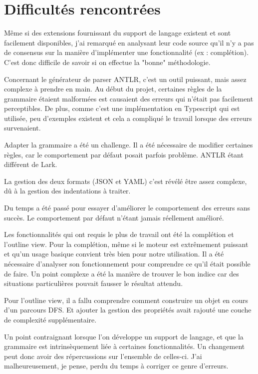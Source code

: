 \documentclass[
    iict, %
    il, %
]{heig-tb}
\begin{document}
\section{Difficultés rencontrées}

Même si des extensions fournissant du support de langage existent et sont facilement disponibles, j'ai remarqué en analysant leur code source qu'il n'y a pas de consensus sur la manière d'implémenter une fonctionnalité (ex : complétion).
C'est donc difficile de savoir si on effectue la "bonne" méthodologie.

Concernant le générateur de parser ANTLR, c'est un outil puissant, mais assez complexe à prendre en main.
Au début du projet, certaines règles de la grammaire étaient malformées est causaient des erreurs qui n'était pas facilement perceptibles.
De plus, comme c'est une implémentation en Typescript qui est utilisée, peu d'exemples existent et cela a compliqué le travail lorsque des erreurs survenaient.

Adapter la grammaire a été un challenge. Il a été nécessaire de modifier certaines règles, car le comportement par défaut posait parfois problème. ANTLR étant différent de Lark.

La gestion des deux formats (JSON et YAML) c'est révélé être assez complexe, dû à la gestion des indentations à traiter.

Du temps a été passé pour essayer d'améliorer le comportement des erreurs sans succès. Le comportement par défaut n'étant jamais réellement amélioré.

Les fonctionnalités qui ont requis le plus de travail ont été la complétion et l'outline view.
Pour la complétion, même si le moteur est extrêmement puissant et qu'un usage basique convient très bien pour notre utilisation.
Il a été nécessaire d'analyser son fonctionnement pour comprendre ce qu'il était possible de faire.
Un point complexe a été la manière de trouver le bon indice car des situations particulières pouvait fausser le résultat attendu.

Pour l'outline view, il a fallu comprendre comment construire un objet en cours d'un parcours DFS. Et ajouter la gestion des propriétés avait rajouté une couche de complexité supplémentaire.

Un point contraignant lorsque l'on développe un support de langage, et que la grammaire est intrinsèquement liée à certaines fonctionnalités.
Un changement peut donc avoir des répercussions sur l'ensemble de celles-ci.
J'ai malheureusement, je pense, perdu du temps à corriger ce genre d'erreurs.
\end{document}
